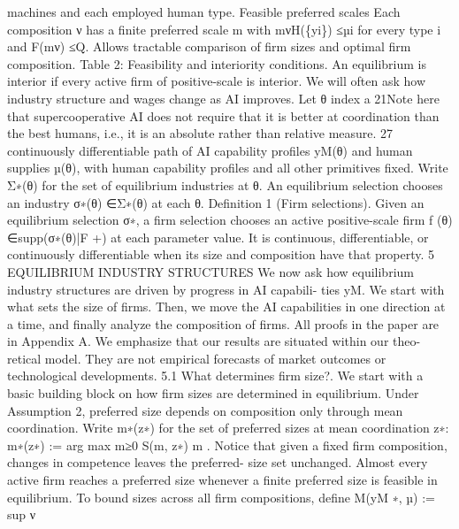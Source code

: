 machines and each
employed human type.
Feasible
preferred scales
Each composition ν has a finite
preferred scale m with mνH(\{yi\}) ≤µi
for every type i and F(mν) ≤Q.
Allows tractable
comparison of firm sizes
and optimal firm
composition.
Table 2: Feasibility and interiority conditions.
An equilibrium is interior if every active firm of positive-scale is interior. We will
often ask how industry structure and wages change as AI improves. Let θ index a
21Note here that supercooperative AI does not require that it is better at coordination than the best
humans, i.e., it is an absolute rather than relative measure.
27
continuously differentiable path of AI capability profiles yM(θ) and human supplies
µ(θ), with human capability profiles and all other primitives fixed. Write Σ∗(θ) for
the set of equilibrium industries at θ. An equilibrium selection chooses an industry
σ∗(θ) ∈Σ∗(θ) at each θ.
Definition 1 (Firm selections). Given an equilibrium selection σ∗, a firm selection
chooses an active positive-scale firm f (θ) ∈supp(σ∗(θ)|F +) at each parameter
value. It is continuous, differentiable, or continuously differentiable when its size and
composition have that property.
5 EQUILIBRIUM INDUSTRY STRUCTURES
We now ask how equilibrium industry structures are driven by progress in AI capabili-
ties yM. We start with what sets the size of firms. Then, we move the AI capabilities in
one direction at a time, and finally analyze the composition of firms. All proofs in the
paper are in Appendix A. We emphasize that our results are situated within our theo-
retical model. They are not empirical forecasts of market outcomes or technological
developments.
5.1 What determines firm size?. We start with a basic building block on how firm
sizes are determined in equilibrium. Under Assumption 2, preferred size depends on
composition only through mean coordination. Write m∗(z∗) for the set of preferred
sizes at mean coordination z∗:
m∗(z∗) := arg max
m≥0
S(m, z∗)
m
.
Notice that given a fixed firm composition, changes in competence leaves the preferred-
size set unchanged. Almost every active firm reaches a preferred size whenever a finite
preferred size is feasible in equilibrium. To bound sizes across all firm compositions,
define
M(yM
∗, µ) := sup
ν


